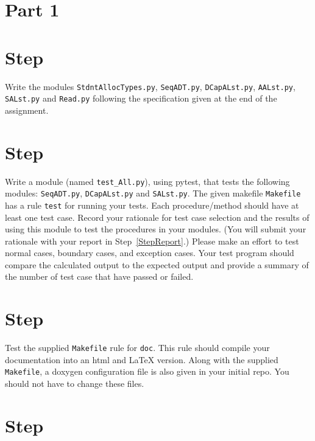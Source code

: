 \documentclass[12pt]{article}
\newcommand{\latex}{\LaTeX\xspace}
\newcounter{stepnum}
\begin{document}
\section*{Part 1}

\section *{Step  \thestepnum}

Write the modules \texttt{StdntAllocTypes.py}, \texttt{SeqADT.py},
\texttt{DCapALst.py}, \texttt{AALst.py}, \texttt{SALst.py} and \texttt{Read.py}
following the specification given at the end of the assignment.

\section *{Step  \thestepnum}

Write a module (named {\tt test\_All.py}), using pytest, that tests the
following modules: {\tt SeqADT.py}, {\tt DCapALst.py} and {\tt SALst.py}.  The
given makefile {\tt Makefile} has a rule \texttt{test} for running your tests.
Each procedure/method should have at least one test case.  Record your rationale for
test case selection and the results of using this module to test the procedures
in your modules.  (You will submit your rationale with your report in
Step~\ref{StepReport}.)  Please make an effort to test normal cases, boundary
cases, and exception cases.  Your test program should compare the calculated
output to the expected output and provide a summary of the number of test case
that have passed or failed.

\section *{Step  \thestepnum}

Test the supplied \texttt{Makefile} rule for {\tt doc}.  This rule should
compile your documentation into an html and \latex version.  Along with the
supplied \texttt{Makefile}, a doxygen configuration file is also given in your
initial repo.  You should not have to change these files.

\section *{Step  \thestepnum}
\end{document}
